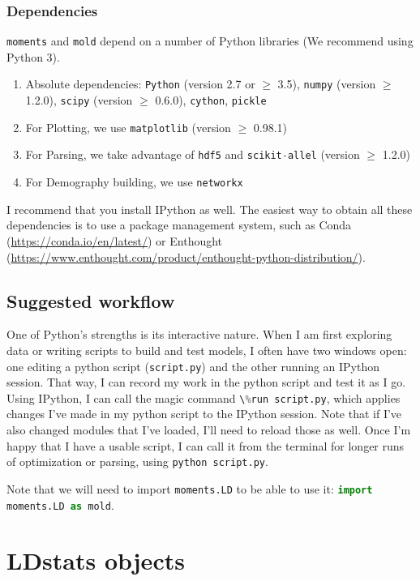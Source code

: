 \documentclass[11pt]{article}
\makeatletter
\renewcommand{\cite}{\citep}
\newcommand{\mold}{\texttt{mold}\xspace}
\newcommand{\py}[1]{\lstinline[breaklines=true,language=Python, showstringspaces=False]@#1@}
\makeatother
\begin{document}
\subsubsection{Dependencies}

\py{moments} and \mold depend on a number of Python libraries (We recommend using Python 3).

\begin{enumerate}
\item Absolute dependencies: \py{Python} (version 2.7 or $\geq$ 3.5), \py{numpy} (version $\geq$ 1.2.0), \py{scipy} (version $\geq$ 0.6.0), \py{cython}, \py{pickle}
\item For Plotting, we use \py{matplotlib} (version $\geq$ 0.98.1)
\item For Parsing, we take advantage of \py{hdf5} and \py{scikit-allel} (version $\geq$ 1.2.0) \cite{}
\item For Demography building, we use \py{networkx}
\end{enumerate}

I recommend that you install IPython as well.
The easiest way to obtain all these dependencies is to use a package management system, such as Conda (\url{https://conda.io/en/latest/}) or Enthought (\url{https://www.enthought.com/product/enthought-python-distribution/}).


\subsection{Suggested workflow}

One of Python's strengths is its interactive nature.
When I am first exploring data or writing scripts to build and test models, I often have two windows open: one editing a python script (\py{script.py}) and the other running an IPython session.
That way, I can record my work in the python script and test it as I go.
Using IPython, I can call the magic command \py{\%run script.py}, which applies changes I've made in my python script to the IPython session.
Note that if I've also changed modules that I've loaded, I'll need to reload those as well.
Once I'm happy that I have a usable script, I can call it from the terminal for longer runs of optimization or parsing, using \py{python script.py}.

Note that we will need to import \py{moments.LD} to be able to use it: \py{import moments.LD as mold}.

\section{LDstats objects}
\end{document}
